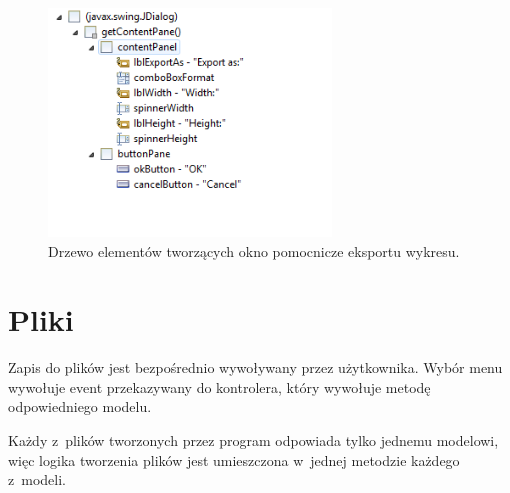 \documentclass[10pt,a4paper]{article}
\begin{document}
\begin{figure}[p]
  \centering
  \includegraphics[width=0.67\textwidth]{figury/wykres-rysuj-widok}
  \caption{Drzewo elementów tworzących okno pomocnicze eksportu wykresu.}
  \label{fig:wykres-rysuj-widok}
\end{figure}

\section{Pliki}

Zapis do plików jest bezpośrednio wywoływany przez użytkownika. Wybór menu
wywołuje event przekazywany do kontrolera, który wywołuje metodę odpowiedniego
modelu.

Każdy z~plików tworzonych przez program odpowiada tylko jednemu modelowi, więc
logika tworzenia plików jest umieszczona w~jednej metodzie każdego z~modeli.
\end{document}
